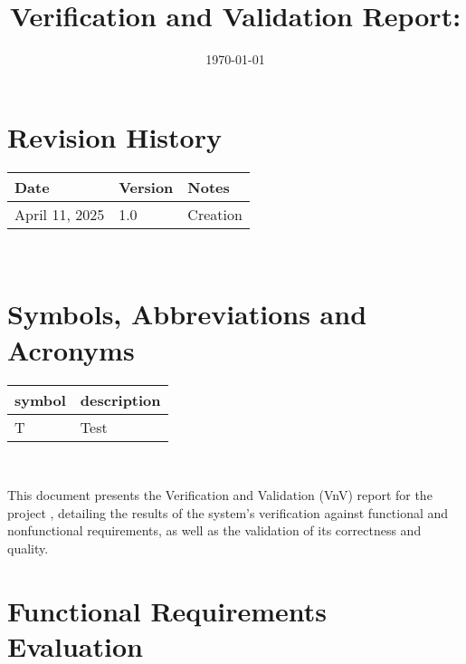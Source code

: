 \documentclass[12pt, titlepage]{article}
\begin{document}
\title{Verification and Validation Report: \progname} 
\author{\authname}
\date{\today}
	
\maketitle


\section{Revision History}

\begin{tabularx}{\textwidth}{p{3cm}p{2cm}X} \toprule {\bf Date} & {\bf Version}
& {\bf Notes}\\
\midrule
April 11, 2025 & 1.0 & Creation\\
\bottomrule
\end{tabularx}

~\newpage

\section{Symbols, Abbreviations and Acronyms}

\renewcommand{\arraystretch}{1.2}
\begin{tabular}{l l} 
  \toprule		
  \textbf{symbol} & \textbf{description}\\
  \midrule 
  T & Test\\
  \bottomrule
\end{tabular}\\

\newpage

\tableofcontents

\listoftables %

\listoffigures %

\newpage


This document presents the Verification and Validation (VnV) report for the
project \progname, detailing the results of the system's verification against
functional and nonfunctional requirements, as well as the validation of its
correctness and quality.

\section{Functional Requirements Evaluation}
\end{document}
